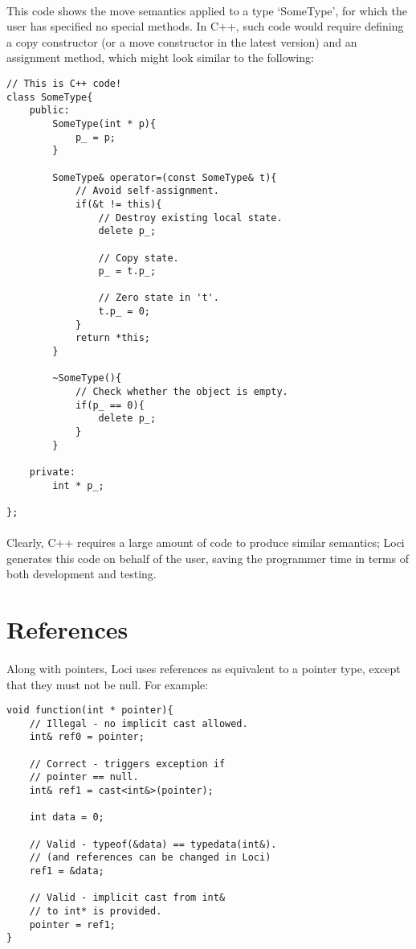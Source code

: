 \documentclass[12pt,twoside,notitlepage]{report}
\begin{document}
\paragraph{}
This code shows the move semantics applied to a type `SomeType', for which the user has specified no special methods. In C++, such code would require defining a copy constructor (or a move constructor in the latest version) and an assignment method, which might look similar to the following:

\small{
\begin{verbatim}
// This is C++ code!
class SomeType{
    public:
        SomeType(int * p){
        	p_ = p;
        }
        
        SomeType& operator=(const SomeType& t){
            // Avoid self-assignment.
            if(&t != this){
                // Destroy existing local state.
                delete p_;
                
                // Copy state.
                p_ = t.p_;
                
                // Zero state in 't'.
                t.p_ = 0;
            }
            return *this;
        }
        
        ~SomeType(){
            // Check whether the object is empty.
            if(p_ == 0){
                delete p_;
            }
        }
    
    private:
        int * p_;
    
};
\end{verbatim}
}

\paragraph{}
Clearly, C++ requires a large amount of code to produce similar semantics; Loci generates this code on behalf of the user, saving the programmer time in terms of both development and testing.

\section{References}

\paragraph{}
Along with pointers, Loci uses references as equivalent to a pointer type, except that they must not be null. For example:

\small{
\begin{verbatim}
void function(int * pointer){
    // Illegal - no implicit cast allowed.
    int& ref0 = pointer;
    
    // Correct - triggers exception if
    // pointer == null.
    int& ref1 = cast<int&>(pointer);
    
    int data = 0;
    
    // Valid - typeof(&data) == typedata(int&).
    // (and references can be changed in Loci)
    ref1 = &data;
    
    // Valid - implicit cast from int&
    // to int* is provided.
    pointer = ref1;
}
\end{verbatim}
}
\end{document}
